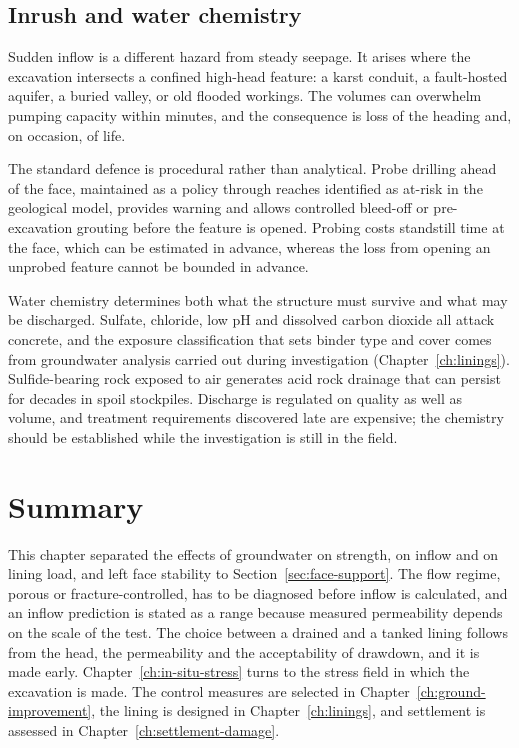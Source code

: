 \subsection{Inrush and water chemistry}
\label{sec:inrush-chemistry}

Sudden inflow is a different hazard from steady seepage. It arises where the
excavation intersects a confined high-head feature: a karst conduit, a
fault-hosted aquifer, a buried valley, or old flooded workings. The volumes
can overwhelm pumping capacity within minutes, and the consequence is loss of
the heading and, on occasion, of life.

The standard defence is procedural rather than analytical. Probe drilling
ahead of the face, maintained as a policy through reaches identified as
at-risk in the geological model, provides warning and allows controlled
bleed-off or pre-excavation grouting before the feature is opened. Probing
costs standstill time at the face, which can be estimated in advance, whereas
the loss from opening an unprobed feature cannot be bounded in advance.

Water chemistry determines both what the structure must survive and what may
be discharged. Sulfate, chloride, low pH and
dissolved carbon dioxide all attack concrete, and the exposure classification
that sets binder type and cover comes from groundwater analysis carried out
during investigation (Chapter~\ref{ch:linings}). Sulfide-bearing rock exposed
to air generates acid rock drainage that can persist for decades in spoil
stockpiles. Discharge is regulated on quality as well as volume, and treatment
requirements discovered late are expensive; the chemistry should be
established while the investigation is still in the field.

\section{Summary}
\label{sec:hydrogeology-summary}

This chapter separated the effects of groundwater on strength, on inflow and
on lining load, and left face stability to Section~\ref{sec:face-support}.
The flow regime, porous or fracture-controlled, has to be diagnosed before
inflow is calculated, and an inflow prediction is stated as a range because
measured permeability depends on the scale of the test. The choice between a
drained and a tanked lining follows from the head, the permeability and the
acceptability of drawdown, and it is made early. Chapter~\ref{ch:in-situ-stress}
turns to the stress field in which the excavation is made. The control
measures are selected in Chapter~\ref{ch:ground-improvement}, the lining is
designed in Chapter~\ref{ch:linings}, and settlement is assessed in
Chapter~\ref{ch:settlement-damage}.

\chapterreferences

